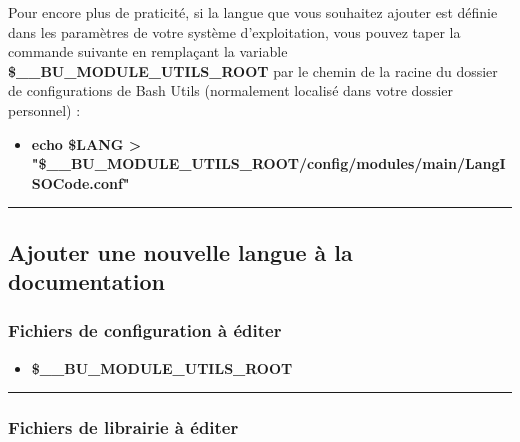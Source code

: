 \documentclass[a4paper,10pt]{article}
\begin{document}
    \begin{justify}
        Pour encore plus de praticité, si la langue que vous souhaitez ajouter est définie dans les paramètres de votre système d'exploitation, vous pouvez taper la commande suivante en remplaçant la variable \textbf{\color{vars}\$\_\_BU\_MODULE\_UTILS\_ROOT} par le chemin de la racine du dossier de configurations de Bash Utils (normalement localisé dans votre dossier personnel) :

        \begin{itemize}
            \item \textbf{\color{cmds}echo \color{vars}\$LANG \color{text} > "\color{vars}\$\_\_BU\_MODULE\_UTILS\_ROOT\color{path}/config/modules/main/LangISOCode.conf\color{text}"}
        \end{itemize}
    \end{justify}




    \color{sec2}\par\noindent\rule{\textwidth}{0.4pt}\color{text}

    \color{sec2}
    \subsection{Ajouter une nouvelle langue à la documentation}\color{text}

    \color{sec3}
    \subsubsection{Fichiers de configuration à éditer}\color{text}

    \begin{itemize}
        \item \textbf{\color{vars}\$\_\_BU\_MODULE\_UTILS\_ROOT\color{path}}
    \end{itemize}



    \color{sec3}\par\noindent\rule{\textwidth}{0.4pt}\color{text}

    \color{sec3}
    \subsubsection{Fichiers de librairie à éditer}\color{text}
\end{document}
